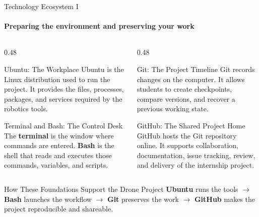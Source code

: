\begin{frame}{Technology Ecosystem I}
\framesubtitle{Preparing the environment and preserving your work}

\footnotesize

\begin{columns}[T,onlytextwidth]
    \begin{column}{0.48\textwidth}
        \begin{block}{Ubuntu: The Workplace}
            Ubuntu is the Linux distribution used to run the project.
            It provides the files, processes, packages, and services
            required by the robotics tools.
        \end{block}

        \begin{block}{Terminal and Bash: The Control Desk}
            The \textbf{terminal} is the window where commands are entered.
            \textbf{Bash} is the shell that reads and executes those commands,
            variables, and scripts.
        \end{block}
    \end{column}
    \hfill
    \begin{column}{0.48\textwidth}
        \begin{block}{Git: The Project Timeline}
            Git records changes on the computer. It allows students to create
            checkpoints, compare versions, and recover a previous working state.
        \end{block}

        \begin{block}{GitHub: The Shared Project Home}
            GitHub hosts the Git repository online. It supports collaboration,
            documentation, issue tracking, review, and delivery of the internship
            project.
        \end{block}
    \end{column}
\end{columns}

\pause

\begin{exampleblock}{How These Foundations Support the Drone Project}
    \centering
    \textbf{Ubuntu} runs the tools
    \(\rightarrow\)
    \textbf{Bash} launches the workflow
    \(\rightarrow\)
    \textbf{Git} preserves the work
    \(\rightarrow\)
    \textbf{GitHub} makes the project reproducible and shareable.
\end{exampleblock}
\end{frame}





